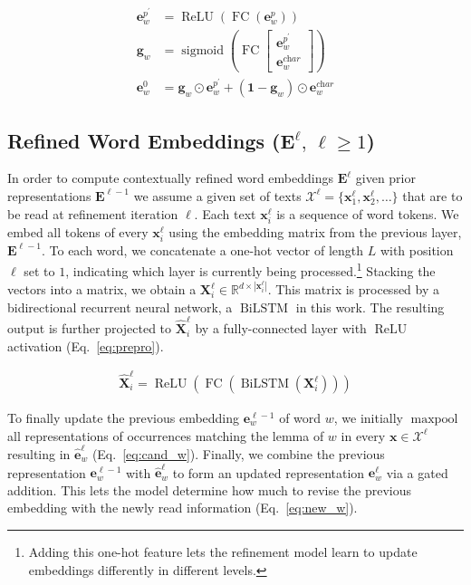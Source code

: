\documentclass[11pt,a4paper]{article}
\begin{document}
\begin{align}
    \mathbf{e}_w^{p^\prime} &= \operatorname{ReLU}( \operatorname{FC} ( \mathbf{e}_w^p ) ) \nonumber \\
    \mathbf{g}_w &= \operatorname{sigmoid} \left( \operatorname{FC} \begin{bmatrix}  \mathbf{e}_w^{p^\prime} \\ \mathbf{e}_w^{\textit{char}} \end{bmatrix} \right) \nonumber \\
    \mathbf{e}^0_w &= \mathbf{g}_w  \odot \mathbf{e}_w^{p^\prime} + (\mathbf{1}-\mathbf{g}_w) \odot \mathbf{e}_w^{\textit{char}} \label{eq:word_embeddings}
\end{align}

\subsection{Refined Word Embeddings ($\mathbf{E}^{\ell},\, \ell \ge 1$)}
\label{sec:contextual_embeddings}
In order to compute contextually refined word embeddings $\mathbf{E}^{\ell}$ given prior representations $\mathbf{E}^{\ell-1}$ we assume a given set of texts $\mathcal{X}^\ell = \{\boldsymbol{x}^\ell_1, \boldsymbol{x}^\ell_2, \ldots \}$ that are to be read at refinement iteration $\ell$. Each text $\boldsymbol{x}^\ell_i$ is a sequence of word tokens. We embed all tokens of every $\boldsymbol{x}^\ell_i$ using the embedding matrix from the previous layer, $\mathbf{E}^{\ell-1}$. To each word, we concatenate a one-hot vector of length $L$ with position $\ell$ set to $1$, indicating which layer is currently being processed.\footnote{Adding this one-hot feature lets the refinement model learn to update embeddings differently in different levels.} Stacking the vectors into a matrix, we obtain a $\mathbf{X}^\ell_i \in \mathbb{R}^{d \times |\boldsymbol{x}^{\ell}_i|}$. This matrix is processed by a bidirectional recurrent neural network, a $\operatorname{BiLSTM}$ \citep{hochreiter1997long} in this work. The resulting output is further projected to $\hat{\mathbf{X}}^\ell_i$ by a fully-connected layer with $\operatorname{ReLU}$ activation (Eq.~\ref{eq:prepro}).

\begin{align}
    \hat{\mathbf{X}}^\ell_i = \operatorname{ReLU} (\operatorname{FC} (\operatorname{BiLSTM} (\mathbf{X}^\ell_i))) \label{eq:prepro}   
\end{align}

To finally update the previous embedding $\mathbf{e}_w^{\ell-1}$ of word $w$, we initially $\operatorname{maxpool}$ all representations of occurrences matching the lemma of $w$ in every $\boldsymbol{x} \in \mathcal{X}^\ell$ resulting in $\hat{\mathbf{e}}^\ell_w$ (Eq.~\ref{eq:cand_w}). Finally, we combine the previous representation $\mathbf{e}_w^{\ell-1}$ with $\hat{\mathbf{e}}^\ell_w$ to form an updated representation $\mathbf{e}_w^\ell$ via a gated addition. This lets the model determine how much to revise the previous embedding with the newly read information (Eq.~\ref{eq:new_w}).
\end{document}
